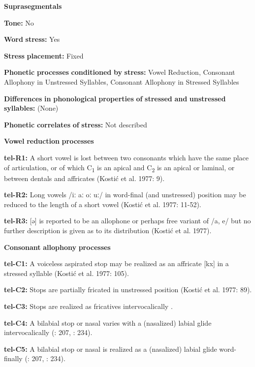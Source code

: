 \begin{styleBody}
\textbf{Suprasegmentals}

\textbf{Tone:} No

\textbf{Word} \textbf{stress:} Yes

\textbf{Stress} \textbf{placement:} Fixed

\textbf{Phonetic} \textbf{processes} \textbf{conditioned} \textbf{by} \textbf{stress:} Vowel Reduction, Consonant Allophony in Unstressed Syllables, Consonant Allophony in Stressed Syllables

\textbf{Differences} \textbf{in} \textbf{phonological} \textbf{properties} \textbf{of} \textbf{stressed} \textbf{and} \textbf{unstressed} \textbf{syllables:} (None)

\textbf{Phonetic} \textbf{correlates} \textbf{of} \textbf{stress:} Not described

\textbf{Vowel} \textbf{reduction} \textbf{processes}

\textbf{tel-R1:} A short vowel is lost between two consonants which have the same place of articulation, or of which C\textsubscript{1} is an apical and C\textsubscript{2} is an apical or laminal, or between dentals and affricates (Kostić et al. 1977: 9).

\textbf{tel-R2:} Long vowels /iː aː oː uː/ in word-final (and unstressed) position may be reduced to the length of a short vowel (Kostić et al. 1977: 11-52).

\textbf{tel-R3:} [ə] is reported to be an allophone or perhaps free variant of /a, e/ but no further description is given as to its distribution (Kostić et al. 1977).

\textbf{Consonant} \textbf{allophony} \textbf{processes}

\textbf{tel-C1:} A voiceless aspirated stop may be realized as an affricate [kx] in a stressed syllable (Kostić et al. 1977: 105).

\textbf{tel-C2:} Stops are partially fricated in unstressed position (Kostić et al. 1977: 89).

\textbf{tel-C3:} Stops are realized as fricatives intervocalically \citep[207]{Krishnamurti1998}.

\textbf{tel-C4:} A bilabial stop or nasal varies with a (nasalized) labial glide intervocalically (\citealt{Krishnamurti1998}: 207, \citealt{BhaskararaoRay2017}: 234).

\textbf{tel-C5:} A bilabial stop or nasal is realized as a (nasalized) labial glide word-finally (\citealt{Krishnamurti1998}: 207, \citealt{BhaskararaoRay2017}: 234).


\end{styleBody}
